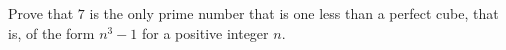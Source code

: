 Prove that $7$ is the only prime number that is one less than a perfect cube, that is, of the form $n^3-1$ for a positive integer $n$.

